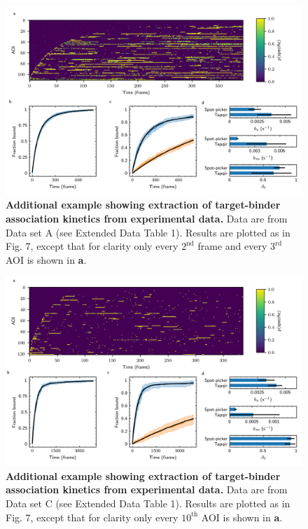 \begin{figure}[t]
\centering
\includegraphics[width=\textwidth]{extended-data/figure4.png}
\caption{\textbf{Additional example showing extraction of target-binder association kinetics from experimental data.} Data are from Data set A (see Extended Data Table 1).  Results are plotted as in Fig. 7, except that for clarity only every $2^\mathrm{nd}$ frame and every $3^\mathrm{rd}$ AOI is shown in \textbf{a}.}
\label{fig:rpb1snap549}
\end{figure}
\pagebreak

\begin{figure}[t]
\centering
\includegraphics[width=\textwidth]{extended-data/figure5.png}
\caption{\textbf{Additional example showing extraction of target-binder association kinetics from experimental data.} Data are from Data set C (see Extended Data Table 1).  Results are plotted as in Fig. 7, except that for clarity only every $10^\mathrm{th}$ AOI is shown in \textbf{a}.}
\label{fig:sigma54_298P2993}
\end{figure}
\clearpage
\pagebreak


